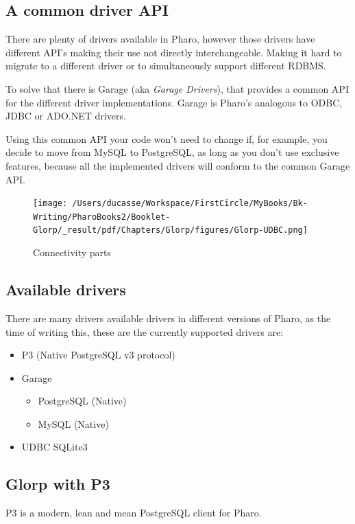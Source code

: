 \documentclass[10pt,twoside,english]{_support/latex/sbabook/sbabook}
\begin{document}
\subsection{A common driver API}
There are plenty of drivers available in Pharo, however those drivers have
different API's making their use not directly interchangeable. Making it hard
to migrate to a different driver or to simultaneously support different RDBMS.

To solve that there is Garage (aka \textit{Garage Drivers}), that provides a common
API for the different driver implementations. Garage is Pharo's analogous to
ODBC, JDBC or ADO.NET drivers.

Using this common API your code won't need to change if, for example, you decide
to move from MySQL to PostgreSQL, as long as you don't use exclusive features,
because all the implemented drivers will conform to the common Garage API.


\begin{figure}

\begin{center}
\texttt{[image: /Users/ducasse/Workspace/FirstCircle/MyBooks/Bk-Writing/PharoBooks2/Booklet-Glorp/\_result/pdf/Chapters/Glorp/figures/Glorp-UDBC.png]}\caption{Connectivity parts\label{Garage diagram}}\end{center}
\end{figure}

\subsection{Available drivers}
There are many drivers available drivers in different versions of Pharo, as
the time of writing this, these are the currently supported drivers are:

\begin{itemize}
\item P3 (Native PostgreSQL v3 protocol)
\item Garage
\begin{itemize}
\item PostgreSQL (Native)
\item MySQL (Native)
\end{itemize}

\item UDBC SQLite3
\end{itemize}
\subsection{Glorp with P3}
P3 is a modern, lean and mean PostgreSQL client for Pharo.
\end{document}
